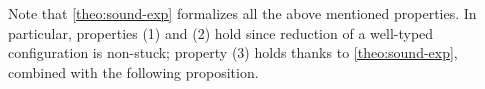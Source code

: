 Note that \cref{theo:sound-exp} formalizes all the above mentioned properties.
In particular, \bez properties (1) and (2) hold since reduction of a well-typed configuration is non-stuck; property (3) holds thanks to \cref{theo:sound-exp}, combined with the following proposition.
\eez
%
%
%
\newcommand{\SigmaTest}{\hat{\Sigma}}
